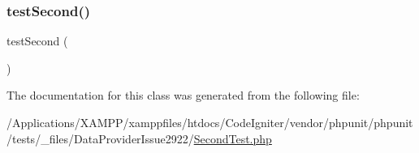 \subsubsection{\texorpdfstring{test\+Second()}{testSecond()}}
{\footnotesize\ttfamily test\+Second (\begin{DoxyParamCaption}{ }\end{DoxyParamCaption})}



The documentation for this class was generated from the following file\+:\begin{DoxyCompactItemize}
\item 
/\+Applications/\+X\+A\+M\+P\+P/xamppfiles/htdocs/\+Code\+Igniter/vendor/phpunit/phpunit/tests/\+\_\+files/\+Data\+Provider\+Issue2922/\mbox{\hyperlink{_data_provider_issue2922_2_second_test_8php}{Second\+Test.\+php}}\end{DoxyCompactItemize}
